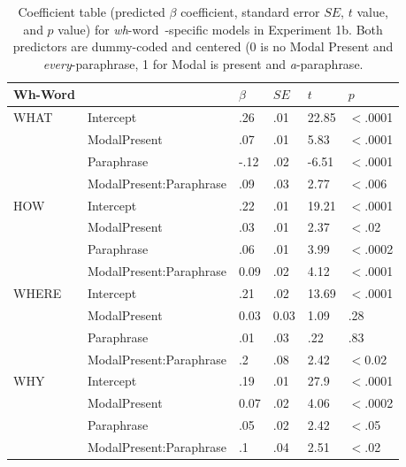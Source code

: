 \documentclass[12pt,letterpaper,table,svgnames,dvipsnames]{article}
\newcommand{\whw}{\emph{wh}-word~}
\begin{document}
\begin{table}[p!]
\begin{center} 
\caption{Coefficient table (predicted $\beta$ coefficient, standard error $SE$, $t$ value, and $p$ value) for \whw-specific models in Experiment 1b. Both predictors are dummy-coded and centered (0 is no Modal Present and \emph{every}-paraphrase, 1 for Modal is present and \emph{a}-paraphrase.} 
\label{sub-model_res_ex1b} 
\begin{tabular}{l|lllll} 
\toprule
Wh-Word & {} & $\beta$ & $SE$ & $t$ & $p$\\
\midrule
WHAT & Intercept & .26 & .01 & 22.85 & $<$.0001\\
{} & ModalPresent & .07 & .01 & 5.83 & $<$.0001\\
{} & Paraphrase & -.12 & .02 & -6.51 & $<$.0001\\
{} & ModalPresent:Paraphrase & .09 & .03 & 2.77 & $<$.006\\
\midrule
HOW & Intercept & .22 & .01 & 19.21 & $<$.0001\\
{} & ModalPresent & .03 & .01 & 2.37 & $<$.02\\
{} & Paraphrase & .06 & .01 & 3.99 & $<$.0002\\
{} & ModalPresent:Paraphrase & 0.09 & .02 & 4.12 & $<$.0001\\
\midrule
WHERE & Intercept & .21 & .02 & 13.69 & $<$.0001\\
{} & ModalPresent & 0.03 & 0.03 & 1.09 & .28\\
{} & Paraphrase & .01 & .03 & .22 & .83\\
{} & ModalPresent:Paraphrase & .2 & .08 & 2.42 & $<$0.02\\
\midrule
WHY & Intercept & .19 & .01 & 27.9 & $<$.0001\\
{} & ModalPresent & 0.07 & .02 & 4.06 & $<$.0002\\
{} & Paraphrase & .05 & .02 & 2.42 & $<$.05\\
{} & ModalPresent:Paraphrase & .1 & .04 & 2.51 & $<$.02\\

\end{tabular}
\end{center}
\end{table}
\end{document}
